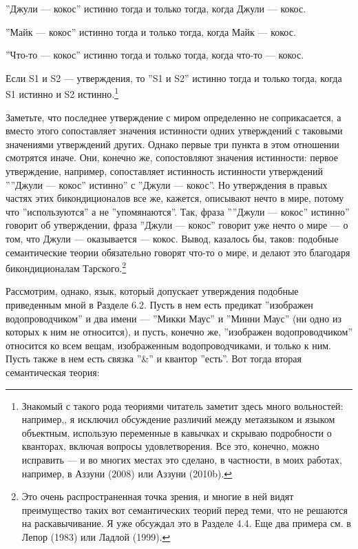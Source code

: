 \documentclass[11pt]{book}
\begin{document}
\smallskip

''Джули --- кокос'' истинно тогда и только тогда, когда Джули --- кокос.

''Майк --- кокос'' истинно тогда и только тогда, когда Майк --- кокос.

''Что-то --- кокос'' истинно тогда и только тогда, когда что-то --- кокос.

Если S1 и S2 --- утверждения, то ''S1 и S2'' истинно тогда и только тогда, когда S1 истинно и S2 истинно.\footnote{Знакомый с такого рода теориями читатель заметит здесь много вольностей: например,, я исключил обсуждение различий между метаязыком и языком объектным, использую переменные в кавычках и скрываю подробности о кванторах, включая вопросы удовлетворения. Все это, конечно, можно исправить --- и во многих местах это сделано, в частности, в моих работах, например, в Аззуни (2008) или Аззуни (2010b).}

\smallskip

Заметьте, что последнее утверждение с миром определенно не соприкасается, а вместо этого сопоставляет значения истинности одних утверждений с таковыми значениями утверждений других. Однако первые три пункта в этом отношении смотрятся иначе. Они, конечно же, сопостовляют значения истинности: первое утверждение, например, сопоставляет истинность истинности утверждений ''''Джули --- кокос'' истинно'' с ''Джули --- кокос''. Но утверждения в правых частях этих бикондиционалов все же, кажется, описывают нечто в мире, потому что ''используются'' а не ''упомянаются''. Так, фраза ''''Джули --- кокос'' истинно'' говорит об утверждении, фраза ''Джули --- кокос'' говорит уже нечто о мире --- о том, что Джули --- оказывается --- кокос. Вывод, казалось бы, таков: подобные семантические теории обязательно говорят что-то о мире, и делают это благодаря бикондиционалам Тарского.\footnote{Это очень распространенная точка зрения, и многие в ней видят преимущество таких вот семантических теорий перед теми, что не решаются на раскавычивание. Я уже обсуждал это в Разделе 4.4. Еще два примера см. в Лепор (1983) или Ладлой (1999).}

Рассмотрим, однако, язык, который допускает утверждения подобные приведенным мной в Разделе 6.2. Пусть в нем есть предикат ''изображен водопроводчиком'' и два имени --- ''Микки Маус'' и ''Минни Маус'' (ни одно из которых к ним не относится), и пусть, конечно же, ''изображен водопроводчиком'' относится ко всем вещам, изображенным водопроводчиками, и только к ним. Пусть также в нем есть связка ''&'' и квантор ''есть''. Вот тогда вторая семантическая теория:
\end{document}
